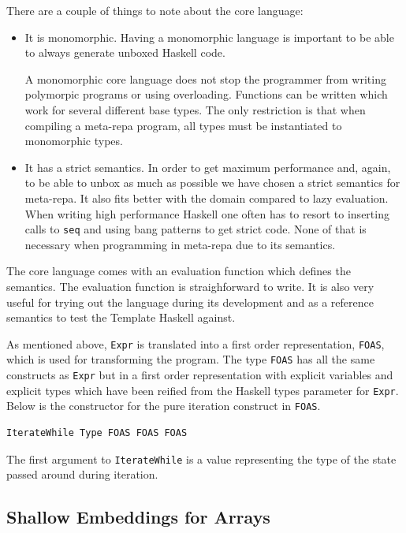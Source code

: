 \documentclass[preprint]{sigplanconf}
\begin{document}
There are a couple of things to note about the core language:

\begin{itemize}
\item
  It is monomorphic. Having a monomorphic language is important to be
  able to always generate unboxed Haskell code.

  A monomorphic core language does not stop the programmer from writing
  polymorpic programs or using overloading. Functions can be written
  which work for several different base types. The only restriction is
  that when compiling a meta-repa program, all types must be
  instantiated to monomorphic types.
\item
  It has a strict semantics. In order to get maximum performance and,
  again, to be able to unbox as much as possible we have chosen a strict
  semantics for meta-repa. It also fits better with the domain compared
  to lazy evaluation. When writing high performance Haskell one often
  has to resort to inserting calls to \texttt{seq} and using bang
  patterns to get strict code. None of that is necessary when
  programming in meta-repa due to its semantics.
\end{itemize}

The core language comes with an evaluation function which defines the
semantics. The evaluation function is straighforward to write. It is
also very useful for trying out the language during its development and
as a reference semantics to test the Template Haskell against.

As mentioned above, \texttt{Expr} is translated into a first order
representation, \texttt{FOAS}, which is used for transforming the
program. The type \texttt{FOAS} has all the same constructs as
\texttt{Expr} but in a first order representation with explicit
variables and explicit types which have been reified from the Haskell
types parameter for \texttt{Expr}. Below is the constructor for the pure
iteration construct in \texttt{FOAS}.

\begin{verbatim}
IterateWhile Type FOAS FOAS FOAS
\end{verbatim}

The first argument to \texttt{IterateWhile} is a value representing the
type of the state passed around during iteration.

\subsection{Shallow Embeddings for Arrays}
\end{document}
